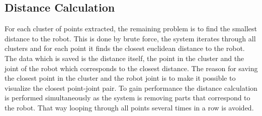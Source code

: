\subsection{Distance Calculation}
For each cluster of points extracted, the remaining problem is to find the smallest distance to the  robot. This is done by brute force, the system iterates through all clusters and for each point it finds the closest euclidean distance to the robot. The data which is saved is the distance itself, the point in the cluster and the joint of the robot which corresponds to the closest distance. The reason for saving the closest point in the cluster and the robot joint is to make it possible to visualize the closest point-joint pair. To gain performance the distance calculation is performed simultaneously as the system is removing parts that correspond to the robot. That way looping through all points several times in a row is avoided.
